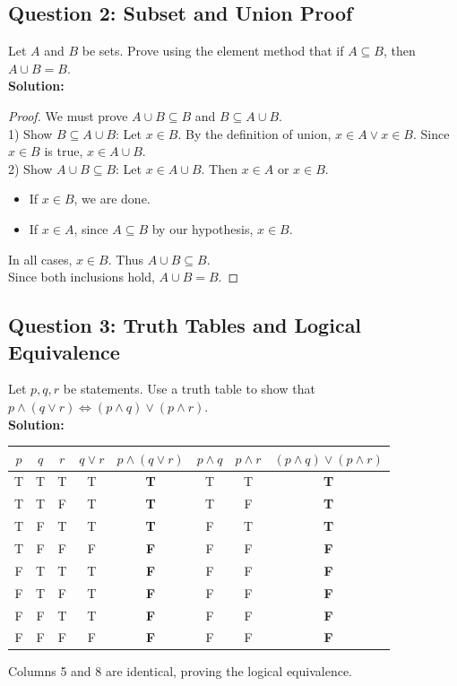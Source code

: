 \documentclass[11pt]{article}
\begin{document}
\subsection*{Question 2: Subset and Union Proof}
Let $A$ and $B$ be sets. Prove using the element method that if $A \subseteq B$, then $A \cup B = B$.\\
\textbf{Solution:}
\begin{proof}
We must prove $A \cup B \subseteq B$ and $B \subseteq A \cup B$. \\
1) Show $B \subseteq A \cup B$: Let $x \in B$. By the definition of union, $x \in A \vee x \in B$. Since $x \in B$ is true, $x \in A \cup B$. \\
2) Show $A \cup B \subseteq B$: Let $x \in A \cup B$. Then $x \in A$ or $x \in B$. 
\begin{itemize}
    \item If $x \in B$, we are done.
    \item If $x \in A$, since $A \subseteq B$ by our hypothesis, $x \in B$.
\end{itemize}
In all cases, $x \in B$. Thus $A \cup B \subseteq B$. \\
Since both inclusions hold, $A \cup B = B$.
\end{proof}

\subsection*{Question 3: Truth Tables and Logical Equivalence}
Let $p, q, r$ be statements. Use a truth table to show that $p \wedge (q \vee r) \Leftrightarrow (p \wedge q) \vee (p \wedge r)$.\\
\textbf{Solution:}
\begin{center}
\begin{tabular}{|c|c|c|c|c|c|c|c|}
\hline
$p$ & $q$ & $r$ & $q \vee r$ & $p \wedge (q \vee r)$ & $p \wedge q$ & $p \wedge r$ & $(p \wedge q) \vee (p \wedge r)$ \\
\hline
T & T & T & T & \textbf{T} & T & T & \textbf{T} \\
T & T & F & T & \textbf{T} & T & F & \textbf{T} \\
T & F & T & T & \textbf{T} & F & T & \textbf{T} \\
T & F & F & F & \textbf{F} & F & F & \textbf{F} \\
F & T & T & T & \textbf{F} & F & F & \textbf{F} \\
F & T & F & T & \textbf{F} & F & F & \textbf{F} \\
F & F & T & T & \textbf{F} & F & F & \textbf{F} \\
F & F & F & F & \textbf{F} & F & F & \textbf{F} \\
\hline
\end{tabular}
\end{center}
Columns 5 and 8 are identical, proving the logical equivalence.
\end{document}
